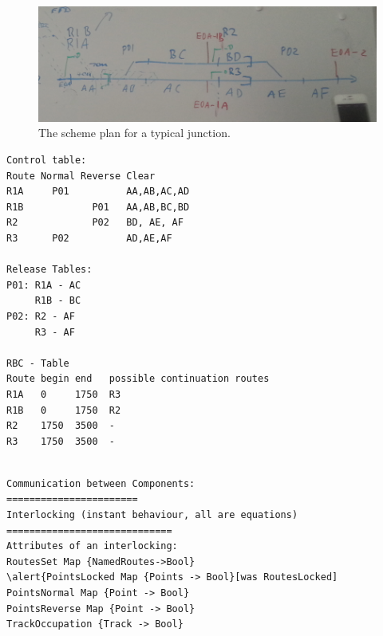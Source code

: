 \begin{figure}
\includegraphics[width=\linewidth]{trackplan.png}
\caption{The scheme plan for a typical junction.}
\label{fig:schemeplan}
\end{figure}

\begin{verbatim}
Control table: 
Route Normal Reverse Clear 
R1A     P01          AA,AB,AC,AD 
R1B            P01   AA,AB,BC,BD 
R2             P02   BD, AE, AF 
R3      P02          AD,AE,AF

Release Tables:
P01: R1A - AC
     R1B - BC
P02: R2 - AF
     R3 - AF

RBC - Table
Route begin end   possible continuation routes
R1A   0     1750  R3
R1B   0     1750  R2
R2    1750  3500  - 
R3    1750  3500  -
\end{verbatim}


\begin{verbatim}

Communication between Components:
=======================
Interlocking (instant behaviour, all are equations)
=============================
Attributes of an interlocking:
RoutesSet Map {NamedRoutes->Bool}
\alert{PointsLocked Map {Points -> Bool}[was RoutesLocked]
PointsNormal Map {Point -> Bool}
PointsReverse Map {Point -> Bool}
TrackOccupation {Track -> Bool}
\end{verbatim}

